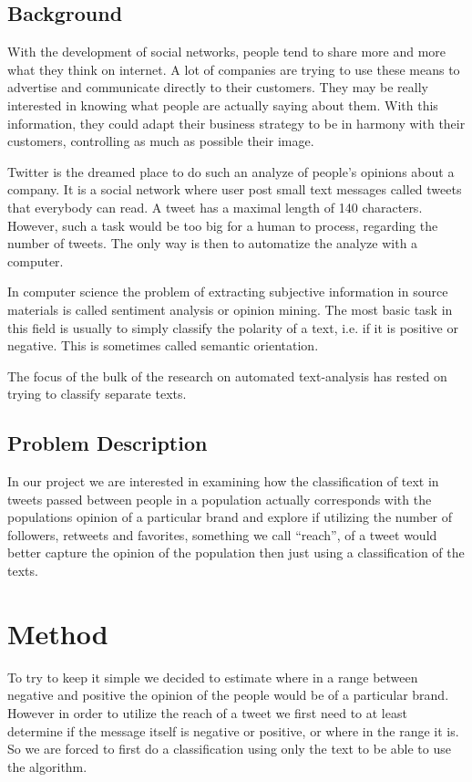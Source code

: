\documentclass[a4paper,12pt]{report}
\begin{document}
\section{Background}

With the development of social networks, people tend to share more and more what they think on internet.
A lot of companies are trying to use these means to advertise and communicate directly to their customers.
They may be really interested in knowing what people are actually saying about them.
With this information, they could adapt their business strategy to be in harmony with their customers, controlling as much as possible their image.

Twitter is the dreamed place to do such an analyze of people's opinions about a company. It is a social network where user post small text messages called tweets that everybody can read. A tweet has a maximal length of 140 characters. However, such a task would be too big for a human to process, regarding the number of tweets. The only way is then to automatize the analyze with a computer.

In computer science the problem of extracting subjective information in source materials is called sentiment analysis or opinion mining. 
The most basic task in this field is usually to simply classify the polarity of a text, i.e. if it is positive or negative. 
This is sometimes called semantic orientation. 

The focus of the bulk of the research on automated text-analysis has rested on trying to classify separate texts.


\section{Problem Description}

In our project we are interested in examining how the classification of text in tweets passed between people in a population actually corresponds with the populations opinion of a particular brand and explore if utilizing the number of followers, retweets and favorites, something we call ``reach'', of a tweet would better capture the opinion of the population then just using a classification of the texts. 

\chapter{Method}

To try to keep it simple we decided to estimate where in a range between negative and positive the opinion of the people would be of a particular brand.
However in order to utilize the reach of a tweet we first need to at least determine if the message itself is negative or positive, or where in the range it is.
So we are forced to first do a classification using only the text to be able to use the algorithm.
\end{document}
